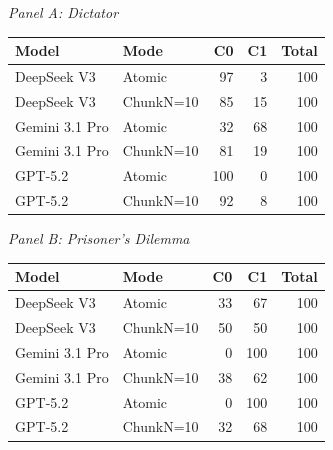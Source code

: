 \begin{center}
\normalsize
\setlength{\tabcolsep}{3pt}
\textit{Panel A: Dictator}\\[2pt]
\begin{tabular*}{\textwidth}{@{\extracolsep{\fill}}llrrr@{}}
\toprule
Model & Mode & C0 & C1 & Total \\
\midrule
DeepSeek V3 & Atomic & 97 & 3 & 100 \\
DeepSeek V3 & ChunkN=10 & 85 & 15 & 100 \\
Gemini 3.1 Pro & Atomic & 32 & 68 & 100 \\
Gemini 3.1 Pro & ChunkN=10 & 81 & 19 & 100 \\
GPT-5.2 & Atomic & 100 & 0 & 100 \\
GPT-5.2 & ChunkN=10 & 92 & 8 & 100 \\
\bottomrule
\end{tabular*}
\par\medskip
\textit{Panel B: Prisoner's Dilemma}\\[2pt]
\begin{tabular*}{\textwidth}{@{\extracolsep{\fill}}llrrr@{}}
\toprule
Model & Mode & C0 & C1 & Total \\
\midrule
DeepSeek V3 & Atomic & 33 & 67 & 100 \\
DeepSeek V3 & ChunkN=10 & 50 & 50 & 100 \\
Gemini 3.1 Pro & Atomic & 0 & 100 & 100 \\
Gemini 3.1 Pro & ChunkN=10 & 38 & 62 & 100 \\
GPT-5.2 & Atomic & 0 & 100 & 100 \\
GPT-5.2 & ChunkN=10 & 32 & 68 & 100 \\
\bottomrule
\end{tabular*}
\end{center}
